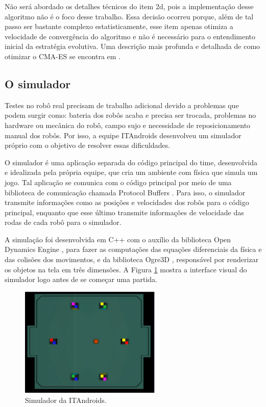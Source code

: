 \documentclass[10pt,fleqn,a4paper]{article}
\begin{document}
Não será abordado os detalhes técnicos do item 2d, pois a implementação desse algoritmo não é o foco desse trabalho. Essa decisão ocorreu porque, além de tal passo ser bastante complexo estatisticamente, esse item apenas otimiza a velocidade de convergência do algoritmo e não é necessário para o entendimento inicial da estratégia evolutiva. Uma descrição mais profunda e detalhada de como otimizar o CMA-ES se encontra em \cite{CMA-ES}.

\subsection{O simulador}

Testes no robô real precisam de trabalho adicional devido a problemas que podem surgir como: bateria dos robôs acaba e precisa ser trocada, problemas no hardware ou mecânica do robô, campo sujo e necessidade de reposicionamento manual dos robôs. Por isso, a equipe ITAndroids desenvolveu um simulador próprio com o objetivo de resolver essas dificuldades.

O simulador é uma aplicação separada do código principal do time, desenvolvida e idealizada pela própria equipe, que cria um ambiente com física que simula um jogo. Tal aplicação se comunica com o código principal por meio de uma biblioteca de comunicação chamada Protocol Buffers \cite{protobuf}. Para isso, o simulador transmite informações como as posições e velocidades dos robôs para o código principal, enquanto que esse último transmite informações de velocidade das rodas de cada robô para o simulador.

A simulação foi desenvolvida em C++ com o auxílio da biblioteca Open Dynamics Engine \cite{ODE}, para fazer as computações das equações diferenciais da física e das colisões dos movimentos, e da biblioteca Ogre3D \cite{Ogre}, responsável por renderizar os objetos na tela em três dimensões. A Figura \ref{fig:simulator} mostra a interface visual do simulador logo antes de se começar uma partida.

\begin{figure}[H]
	\centering
	\includegraphics[width=0.6\textwidth]{figures/SimulatorWithoutButtons.png}
	\caption{Simulador da ITAndroids.}
	\label{fig:simulator}
\end{figure}
\end{document}
